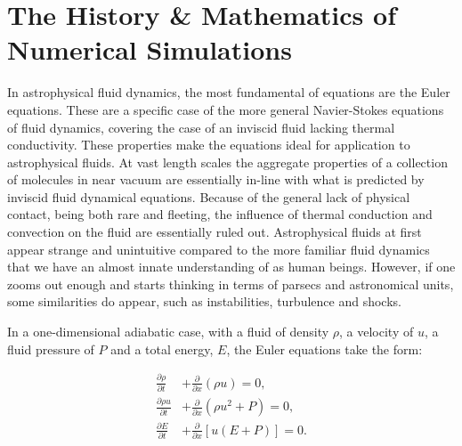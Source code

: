 \section{The History \& Mathematics of Numerical Simulations}
\label{sec:numerical-math}
\label{sec:numsim}

In astrophysical fluid dynamics, the most fundamental of equations are the Euler equations.
These are a specific case of the more general Navier-Stokes equations of fluid dynamics, covering the case of an inviscid fluid lacking thermal conductivity.
These properties make the equations ideal for application to astrophysical fluids.
At vast length scales the aggregate properties of a collection of molecules in near vacuum are essentially in-line with what is predicted by inviscid fluid dynamical equations.
Because of the general lack of physical contact, being both rare and fleeting, the influence of thermal conduction and convection on the fluid are essentially ruled out.
Astrophysical fluids at first appear strange and unintuitive compared to the more familiar fluid dynamics that we have an almost innate understanding of as human beings.
However, if one zooms out enough and starts thinking in terms of parsecs and astronomical units, some similarities do appear, such as instabilities, turbulence and shocks.

In a one-dimensional adiabatic case, with a fluid of density $\rho$, a velocity of $u$, a fluid pressure of $P$ and a total energy, $E$, the Euler equations take the form:

\begin{subequations}
  \begin{align}
    \frac{\partial \rho}{\partial t} & + \frac{\partial}{\partial x} (\rho u) = 0 ,\\
    \frac{\partial \rho u}{\partial t} & + \frac{\partial}{\partial x} (\rho u^2 + P) = 0 ,\\
    \frac{\partial E}{\partial t} & + \frac{\partial}{\partial x} \left[ u(E+P) \right] = 0 .
  \end{align}
\end{subequations}

